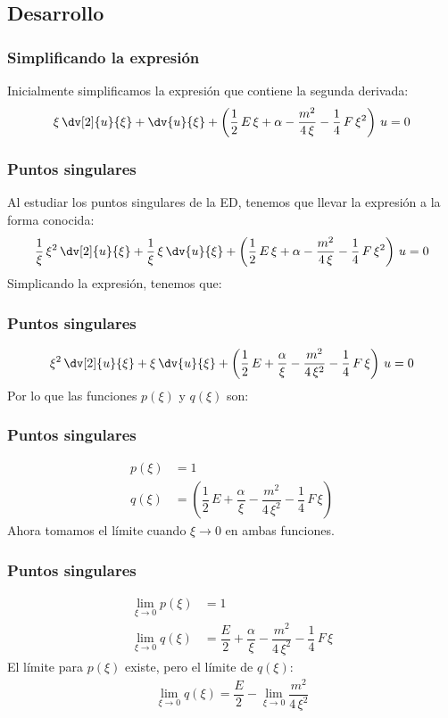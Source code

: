 \subsection{Desarrollo}
\begin{frame}
\frametitle{Simplificando la expresión}
Inicialmente simplificamos la expresión que contiene la segunda derivada:
\pause
\begin{align*}
\xi \, \dv[2]{u}{\xi} + \dv{u}{\xi} + \left( \dfrac{1}{2} \, E \, \xi + \alpha - \dfrac{m^{2}}{4 \, \xi} - \dfrac{1}{4} \, F \, \xi^{2} \right) \, u = 0
\end{align*}
\end{frame}
\begin{frame}
\frametitle{Puntos singulares}
Al estudiar los puntos singulares de la ED, tenemos que llevar la expresión a la forma conocida:
\begin{align*}
\dfrac{1}{\xi} \, \xi^{2} \, \dv[2]{u}{\xi} + \dfrac{1}{\xi} \, \xi \, \dv{u}{\xi} + \left( \dfrac{1}{2} \, E \, \xi + \alpha - \dfrac{m^{2}}{4 \, \xi} - \dfrac{1}{4} \, F \, \xi^{2} \right) \, u = 0
\end{align*}
\pause
Simplicando la expresión, tenemos que:
\end{frame}
\begin{frame}
\frametitle{Puntos singulares}
\vspace*{-1cm}
\begin{align*}
\xi^{2} \, \dv[2]{u}{\xi} + \xi \, \dv{u}{\xi} + \left( \dfrac{1}{2} \, E +  \dfrac{\alpha}{\xi} - \dfrac{m^{2}}{4 \, \xi^{2}} - \dfrac{1}{4} \, F \, \xi \right) \, u = 0
\end{align*}
\pause
Por lo que las funciones $p(\xi)$ y $q(\xi)$ son:
\end{frame}
\begin{frame}
\frametitle{Puntos singulares}
\begin{align*}
p(\xi) &= 1 \\[0.5em]
q(\xi) &= \left( \dfrac{1}{2} \, E +  \dfrac{\alpha}{\xi} - \dfrac{m^{2}}{4 \, \xi^{2}} - \dfrac{1}{4} \, F \, \xi \right)
\end{align*}
\pause
Ahora tomamos el límite cuando $\xi \to 0$ en ambas funciones.
\end{frame}
\begin{frame}
\frametitle{Puntos singulares}
\begin{align*}
\lim_{\xi \to 0} p(\xi) &= 1 \\[0.5em]
\lim_{\xi \to 0} q(\xi) &= \dfrac{E}{2} +  \dfrac{\alpha}{\xi} - \dfrac{m^{2}}{4 \, \xi^{2}} - \dfrac{1}{4} \, F \, \xi
\end{align*}
\pause
El límite para $p(\xi)$ existe, pero el límite de $q(\xi)$:
\begin{align*}
\lim_{\xi \to 0} q(\xi) = \dfrac{E}{2} - \lim_{\xi \to 0} \dfrac{m^{2}}{4 \, \xi^{2}} 
\end{align*}
\end{frame}
